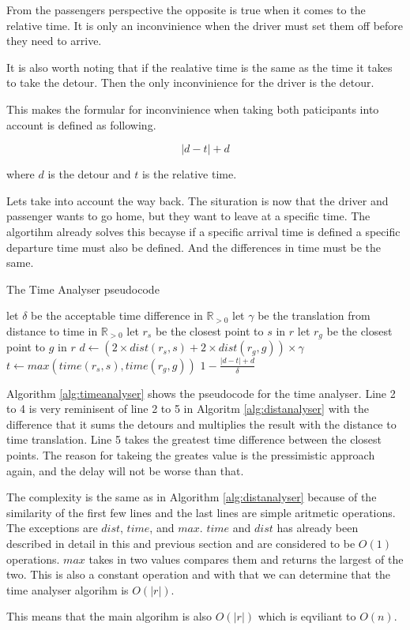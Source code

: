 From the passengers perspective the opposite is true when it comes to the relative time. 
It is only an inconvinience when the driver must set them off before they need to arrive.

It is also worth noting that if the realative time is the same as the time it takes to take the detour.
Then the only inconvinience for the driver is the detour.

This makes the formular for inconvinience when taking both paticipants into account is defined as following.

\[ |d - t| + d \]

where $d$ is the detour and $t$ is the relative time.

Lets take into account the way back.
The situration is now that the driver and passenger wants to go home, but they want to leave at a specific time.
The algortihm already solves this becayse if a specific arrival time is defined a specific departure time must also be defined.
And the differences in time must be the same.

\begin{algorithm}
	\caption{The Time Analyser pseudocode}
	\label{alg:timeanalyser}
	\begin{algorithmic}[1]
		\Require 
		\Statex let $\delta$ be the acceptable time difference in $\mathbb{R}_{>0}$
		\Statex let $\gamma$ be the translation from distance to time in $\mathbb{R}_{>0}$ 
		\Statex 
			\State let $r_s$ be the closest point to $s$ in $r$
			\State let $r_g$ be the closest point to $g$ in $r$
			\State $d \gets (2\times dist(r_s,s) + 2\times dist(r_g,g))\times\gamma$
			\State $t \gets max(time(r_s, s), time(r_g, g))$
			\State\Return $1-\frac{|d - t| + d}{\delta}$
		\EndFunction
	\end{algorithmic}
\end{algorithm}

Algorithm \ref{alg:timeanalyser} shows the pseudocode for the time analyser.
Line 2 to 4 is very reminisent of line 2 to 5 in Algoritm \ref{alg:distanalyser} with the difference that it sums the detours and multiplies the result with the distance to time translation.
Line 5 takes the greatest time difference between the closest points.
The reason for takeing the greates value is the pressimistic approach again, and the delay will not be worse than that.

The complexity is the same as in Algorithm \ref{alg:distanalyser} because of the similarity of the first few lines and the last lines are simple aritmetic operations. 
The exceptions are $dist$, $time$, and $max$. 
$time$ and $dist$ has already been described in detail in this and previous section and are considered to be $O(1)$ operations.
$max$ takes in two values compares them and returns the largest of the two.
This is also a constant operation and with that we can determine that the time analyser algorihm is $O(|r|)$.

This means that the main algorihm is also $O(|r|)$ which is eqviliant to $O(n)$.
